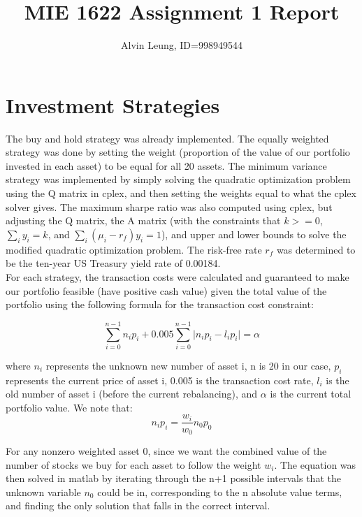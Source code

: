 \documentclass[english]{scrartcl}
\author{Alvin Leung, ID=998949544}
\title{\textbf{MIE 1622 Assignment 1 Report}}
\date{\vspace{-5ex}}
\begin{document}
	
	\maketitle
	\section{Investment Strategies}
	
	 The buy and hold strategy was already implemented. The equally weighted strategy was done by setting the weight (proportion of the value of our portfolio invested in each asset) to be equal for all 20 assets. The minimum variance strategy was implemented by simply solving the quadratic optimization problem using the Q matrix in cplex, and then setting the weights equal to what the cplex solver gives. The maximum sharpe ratio was also computed using cplex, but adjusting the Q matrix, the A matrix (with the constraints that $k >= 0$, $\sum_{i} y_{i} = k$, and $\sum_{i} (\mu_{i} - r_{f})y_{i} = 1$), and upper and lower bounds to solve the modified quadratic optimization problem.  The risk-free rate $r_{f}$ was determined to be the ten-year US Treasury yield rate of 0.00184. \\
	 
	 For each strategy, the transaction costs were calculated and guaranteed to make our portfolio feasible (have positive cash value) given the total value of the portfolio using the following formula for the transaction cost constraint:
	 
	 \begin{equation}
	 \sum_{i=0}^{n-1} n_{i}p_{i} + 0.005\sum_{i=0}^{n-1} \lvert n_{i} p_{i} - l_{i} p_{i} \rvert = \alpha
    \end{equation}
    
    where $n_{i}$ represents the unknown new number of asset i,  n is 20 in our case, $p_{i}$ represents the current price of asset i, 0.005 is the transaction cost rate, $l_{i}$ is the old number of asset i (before the current rebalancing), and $\alpha$ is the current total portfolio value. We note that: \\
    
		 \begin{equation}
		n_{i} p_{i} = \frac{w_{i}}{w_{0}} n_{0} p_{0}
		 \end{equation}
		 
		 For any nonzero weighted asset 0, since we want the combined value of the number of stocks we buy for each asset to follow the weight $w_{i}$. The equation was then solved in matlab by iterating through the n+1 possible intervals that the unknown variable $n_{0}$ could be in, corresponding to the n absolute value terms, and finding the only solution that falls in the correct interval. \\
		 
\end{document}
